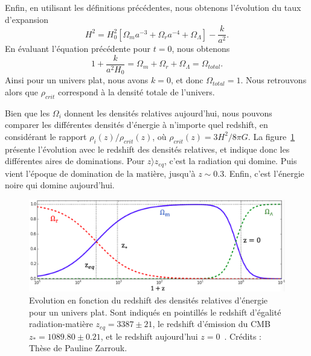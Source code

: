 \documentclass[11pt, twoside, a4paper, openright]{report}
\begin{document}
Enfin, en utilisant les définitions précédentes, nous obtenons l'évolution du taux d'expansion
\begin{equation}
  \label{eq:friedmann7}
  H^2 = H_0^2 \left[\Omega_m a^{-3} + \Omega_r a^{-4} + \Omega_{\Lambda} \right] - \frac{k}{a^{2}} .
\end{equation}
En évaluant l'équation précédente pour $t=0$, nous obtenons
\begin{equation}
  \label{eq:sum_omega}
 1 + \frac{k}{a^{2} H_{0}}  =  \Omega_m + \Omega_r + \Omega_{\Lambda} = \Omega_{total} .
\end{equation}
Ainsi pour un univers plat, nous avons $k = 0$, et donc $\Omega_{total} = 1$. Nous retrouvons alors que $\rho_{crit}$ correspond à la densité totale de l'univers. 

Bien que les $\Omega_i$ donnent les densités relatives aujourd'hui, nous pouvons comparer les différentes densités d'énergie à n'importe quel redshift, en considérant le rapport $\rho_{i}(z) / \rho_{crit}(z)$, où $\rho_{crit}(z) = 3H^{2} / 8 \pi G$. La figure~\ref{fig:evol_omega} présente l'évolution  avec le redshift des densités relatives, et indique donc les différentes aires de dominations. Pour $z \rangle z_{eq}$, c'est la radiation qui domine. Puis vient l'époque de domination de la matière, jusqu'à $z \sim 0.3$. Enfin, c'est l'énergie noire qui domine aujourd'hui.
\begin{figure}
  \centering
  \includegraphics[scale=0.4]{evol_omega}
  \caption{Evolution en fonction du redshift des densités relatives d'énergie pour un univers plat. Sont indiqués en pointillés le redshift d'égalité radiation-matière $z_{eq} = 3387 \pm 21$, le redshift d'émission du CMB $z_{\ast} = 1089.80 \pm 0.21$, et le redshift aujourd'hui $z = 0$~\cite{CITEplanck2018}. Crédits : Thèse de Pauline Zarrouk.}
\label{fig:evol_omega}
\end{figure}
\end{document}
